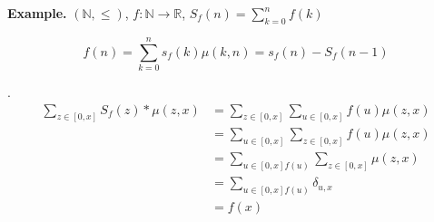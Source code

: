 \textbf{Example.}
$(\mathbb{N}, \leq)$, $f: \mathbb{N} \rightarrow \mathbb{R}$, $S_f(n) = \sum_{k=0}^{n} f(k)$

\[    
  f(n) = \sum_{k=0}^{n} s_f(k) \mu(k,n) = s_f(n) - S_f(n-1)
\]

\Proof. 
\begin{align*}
    \sum_{z \in [0,x]} S_f(z) * \mu(z,x) 
    &= \sum_{z \in [0,x]} \sum_{u \in [0,x]} f(u) \mu(z,x) \\
    &= \sum_{u \in [0,x]} \sum_{z \in [0,x]} f(u) \mu(z,x) \\
    &= \sum_{u \in [0,x] f(u)} \sum_{z \in [0,x]} \mu(z,x) \\
    &= \sum_{u \in [0,x] f(u)} \delta_{u,x} \\
    &= f(x)
\end{align*}


